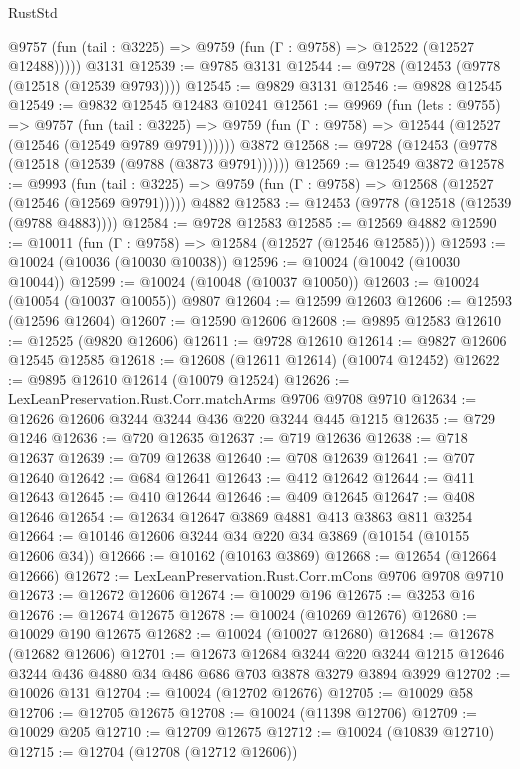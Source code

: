 \begin{lexlean}{RustStd}
\begin{coremodule}
      @9757 (fun (tail : @3225) => @9759 (fun (Γ : @9758) => @12522 (@12527 @12488)))))
    @3131
@12539 := @9785 @3131
@12544 := @9728 (@12453 (@9778 (@12518 (@12539 @9793))))
@12545 := @9829 @3131
@12546 := @9828 @12545
@12549 := @9832 @12545 @12483 @10241
@12561 := @9969
    (fun (lets : @9755) =>
    @9757
      (fun (tail : @3225) =>
      @9759 (fun (Γ : @9758) => @12544 (@12527 (@12546 (@12549 @9789 @9791))))))
    @3872
@12568 := @9728 (@12453 (@9778 (@12518 (@12539 (@9788 (@3873 @9791))))))
@12569 := @12549 @3872
@12578 := @9993
    (fun (tail : @3225) => @9759 (fun (Γ : @9758) => @12568 (@12527 (@12546 (@12569 @9791)))))
    @4882
@12583 := @12453 (@9778 (@12518 (@12539 (@9788 @4883))))
@12584 := @9728 @12583
@12585 := @12569 @4882
@12590 := @10011 (fun (Γ : @9758) => @12584 (@12527 (@12546 @12585)))
@12593 := @10024 (@10036 (@10030 @10038))
@12596 := @10024 (@10042 (@10030 @10044))
@12599 := @10024 (@10048 (@10037 @10050))
@12603 := @10024 (@10054 (@10037 @10055)) @9807
@12604 := @12599 @12603
@12606 := @12593 (@12596 @12604)
@12607 := @12590 @12606
@12608 := @9895 @12583
@12610 := @12525 (@9820 @12606)
@12611 := @9728 @12610
@12614 := @9827 @12606 @12545 @12585
@12618 := @12608 (@12611 @12614) (@10074 @12452)
@12622 := @9895 @12610 @12614 (@10079 @12524)
@12626 := LexLeanPreservation.Rust.Corr.matchArms @9706 @9708 @9710
@12634 := @12626 @12606 @3244 @3244 @436 @220 @3244 @445 @1215
@12635 := @729 @1246
@12636 := @720 @12635
@12637 := @719 @12636
@12638 := @718 @12637
@12639 := @709 @12638
@12640 := @708 @12639
@12641 := @707 @12640
@12642 := @684 @12641
@12643 := @412 @12642
@12644 := @411 @12643
@12645 := @410 @12644
@12646 := @409 @12645
@12647 := @408 @12646
@12654 := @12634 @12647 @3869 @4881 @413 @3863 @811 @3254
@12664 := @10146 @12606 @3244 @34 @220 @34 @3869 (@10154 (@10155 @12606 @34))
@12666 := @10162 (@10163 @3869)
@12668 := @12654 (@12664 @12666)
@12672 := LexLeanPreservation.Rust.Corr.mCons @9706 @9708 @9710
@12673 := @12672 @12606
@12674 := @10029 @196
@12675 := @3253 @16
@12676 := @12674 @12675
@12678 := @10024 (@10269 @12676)
@12680 := @10029 @190 @12675
@12682 := @10024 (@10027 @12680)
@12684 := @12678 (@12682 @12606)
@12701 := @12673
    @12684
    @3244
    @220
    @3244
    @1215
    @12646
    @3244
    @436
    @4880
    @34
    @486
    @686
    @703
    @3878
    @3279
    @3894
    @3929
@12702 := @10026 @131
@12704 := @10024 (@12702 @12676)
@12705 := @10029 @58
@12706 := @12705 @12675
@12708 := @10024 (@11398 @12706)
@12709 := @10029 @205
@12710 := @12709 @12675
@12712 := @10024 (@10839 @12710)
@12715 := @12704 (@12708 (@12712 @12606))

\end{coremodule}
\end{lexlean}
